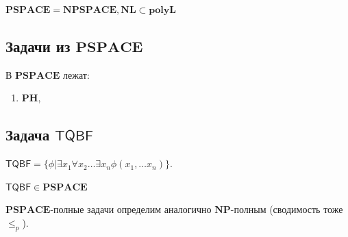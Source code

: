 \begin{corollary}
    \(\mathbf{PSPACE} = \mathbf{NPSPACE}, \mathbf{NL} \subset \mathbf{polyL}\)
\end{corollary}

\subsection{Задачи из \(\mathbf{PSPACE}\)}
\begin{note}
    В \(\mathbf{PSPACE}\) лежат:
    \begin{enumerate}
        \item \(\mathbf{PH}\), 
    \end{enumerate}
\end{note}

\subsection{Задача \(\mathsf{TQBF}\)}
\begin{definition}
    \(\mathsf{TQBF} = \{\phi | \exists x_1 \forall x_2 \dots \exists x_n \phi(x_1, \dots x_n)\}\).
\end{definition}

\begin{note}
    \(\mathsf{TQBF} \in \mathbf{PSPACE}\)
\end{note}

\begin{definition}
    \(\mathbf{PSPACE}\)-полные задачи определим аналогично \(\mathbf{NP}\)-полным (сводимость тоже \(\le_p\)).
\end{definition}

